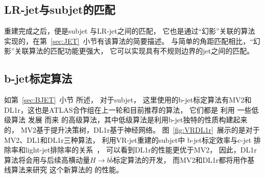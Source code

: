 \subsection{LR-jet与subjet的匹配}
\label{sec:XbbORMT}

重建完成之后，便是subjet
与LR-jet之间的匹配，
它也是通过“幻影”关联的算法
实现的，在第~\ref{sec:JET}~小节有该算法的简要描述。
与简单的角距匹配相比，“幻影”关联算法的匹配功能更强大，
它可以实现具有不规则边界的jet之间的匹配。


\subsection{b-jet标定算法}
\label{sec:XbbORBJ}

如第~\ref{sec:BJET}~小节
所述，
对于subjet，
这里使用的b-jet标定算法有MV2和DL1r，这也是ATLAS合作组在上一轮和目前推荐的算法，
它们都是%
利用
一些低级算法
发展
而来
的高级算法，其中低级算法是利用b-jet独特的性质构建起来的，
MV2基于提升决策树，DL1r基于神经网络。
图~\ref{fig:VRDL1r}~展示的是对于MV2、DL1和DL1r三种算法，
利用VR-jet重建的subjet中
b-jet标定效率与c-jet
排除率和light-jet排除率的关系~\cite{DLOR2}，
可以看到DL1r的性能更优于MV2，
因此，DL1r算法将会用与后续高横动量$H\rightarrow b\bar{b}$标定算法的开发，
而MV2和DL1r都将用作基线算法来研究
这个新算法的
的性能。

